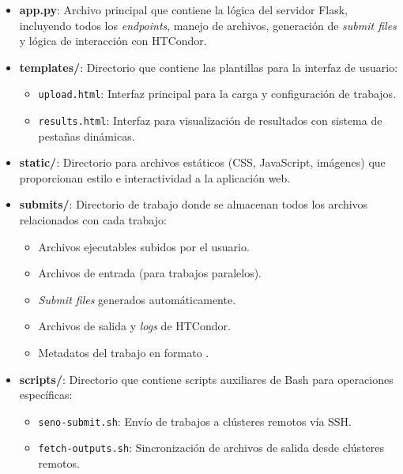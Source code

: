 \begin{itemize}
	\item \textbf{app.py}: Archivo principal que contiene la lógica del servidor Flask, incluyendo todos los \textit{endpoints}, manejo de archivos, generación de \textit{submit files} y lógica de interacción con HTCondor.
	
	\item \textbf{templates/}: Directorio que contiene las plantillas \HTML para la interfaz de usuario:
	\begin{itemize}
		\item \texttt{upload.html}: Interfaz principal para la carga y configuración de trabajos.
		\item \texttt{results.html}: Interfaz para visualización de resultados con sistema de pestañas dinámicas.
	\end{itemize}
	
	\item \textbf{static/}: Directorio para archivos estáticos (CSS, JavaScript, imágenes) que proporcionan estilo e interactividad a la aplicación web.
	
	\item \textbf{submits/}: Directorio de trabajo donde se almacenan todos los archivos relacionados con cada trabajo:
	\begin{itemize}
		\item Archivos ejecutables subidos por el usuario.
		\item Archivos de entrada (para trabajos paralelos).
		\item \textit{Submit files} generados automáticamente.
		\item Archivos de salida y \textit{logs} de HTCondor.
		\item Metadatos del trabajo en formato \JSON.
	\end{itemize}
	
	\item \textbf{scripts/}: Directorio que contiene scripts auxiliares de Bash para operaciones específicas:
	\begin{itemize}
		\item \texttt{seno-submit.sh}: Envío de trabajos a clústeres remotos vía SSH.
		\item \texttt{fetch-outputs.sh}: Sincronización de archivos de salida desde clústeres remotos.
	\end{itemize}
\end{itemize}

